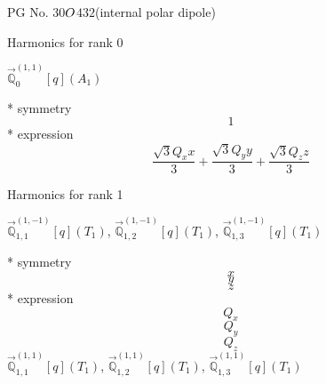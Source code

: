 \documentclass[fleqn,8pt]{jsarticle}
\begin{document}
\setcounter{MaxMatrixCols}{32}

\renewcommand{\tablename}{Table~}
\renewcommand{\figurename}{Figure~}
\begin{center}
\LARGE
PG No. 30\quad$O_{\rm }$\quad$432$\quad[ cubic ] (internal polar dipole)
\end{center}

\noindent * Harmonics for rank 0

\noindent\quad $\vec{\mathbb{Q}}_{0}^{(1,1)}[q](A_{1})$

\noindent\quad ** symmetry
\begin{dmath*}
1
\end{dmath*}
\noindent\quad ** expression
\begin{dmath*}
\frac{\sqrt{3} Q_{x} x}{3} + \frac{\sqrt{3} Q_{y} y}{3} + \frac{\sqrt{3} Q_{z} z}{3}
\end{dmath*}

\noindent * Harmonics for rank 1

\noindent\quad $\vec{\mathbb{Q}}_{1,1}^{(1,-1)}[q](T_{1})$, $\vec{\mathbb{Q}}_{1,2}^{(1,-1)}[q](T_{1})$, $\vec{\mathbb{Q}}_{1,3}^{(1,-1)}[q](T_{1})$

\noindent\quad ** symmetry
\begin{dmath*}
x
\end{dmath*}
\begin{dmath*}
y
\end{dmath*}
\begin{dmath*}
z
\end{dmath*}
\noindent\quad ** expression
\begin{dmath*}
Q_{x}
\end{dmath*}
\begin{dmath*}
Q_{y}
\end{dmath*}
\begin{dmath*}
Q_{z}
\end{dmath*}
\noindent\quad $\vec{\mathbb{Q}}_{1,1}^{(1,1)}[q](T_{1})$, $\vec{\mathbb{Q}}_{1,2}^{(1,1)}[q](T_{1})$, $\vec{\mathbb{Q}}_{1,3}^{(1,1)}[q](T_{1})$
\end{document}
